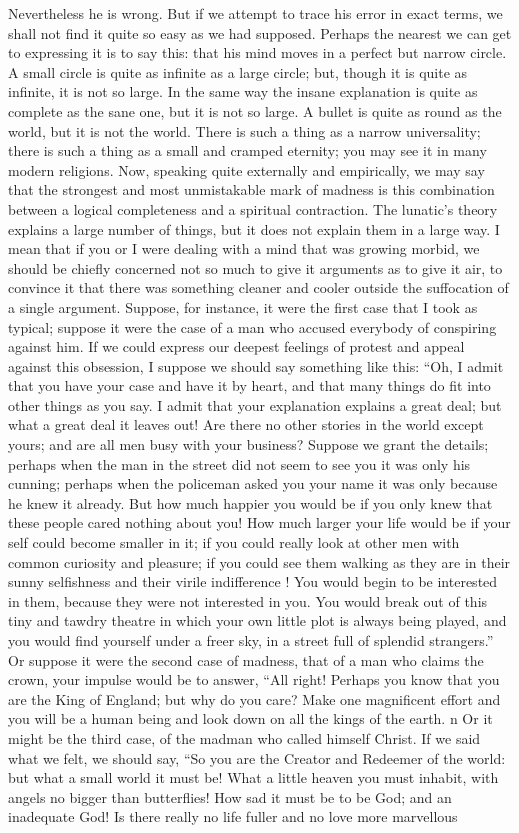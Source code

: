\documentclass{book}
\begin{document}
Nevertheless he is wrong. But if we attempt to trace his error in exact terms, we shall not find it quite so easy as we had supposed. Perhaps the nearest we can get to expressing it is to say this: that his mind moves in a perfect but narrow circle. A small circle is quite as infinite as a large circle; but, though it is quite as infinite, it is not so large. In the same way the insane explanation is quite as complete as the sane one, but it is not so large. A bullet is quite as round as the world, but it is not the world. There is such a thing as a narrow universality; there is such a thing as a small and cramped eternity; you may see it in many modern religions. Now, speaking quite externally and empirically, we may say that the strongest and most unmistakable mark of madness is this combination between a logical completeness and a spiritual contraction. The lunatic’s theory explains a large number of things, but it does not explain them in a large way. I mean that if you or I were dealing with a mind that was growing morbid, we should be chiefly concerned not so much to give it arguments as to give it air, to convince it that there was something cleaner and cooler outside the suffocation of a single argument. Suppose, for instance, it were the first case that I took as typical; suppose it were the case of a man who accused everybody of conspiring against him. If we could express our deepest feelings of protest and appeal against this obsession, I suppose we should say something like this: “Oh, I admit that you have your case and have it by heart, and that many things do fit into other things as you say. I admit that your explanation explains a great deal; but what a great deal it leaves out! Are there no other stories in the world except yours; and are all men busy with your business? Suppose we grant the details; perhaps when the man in the street did not seem to see you it was only his cunning; perhaps when the policeman asked you your name it was only because he knew it already. But how much happier you would be if you only knew that these people cared nothing about you! How much larger your life would be if your self could become smaller in it; if you could really look at other men with common curiosity and pleasure; if you could see them walking as they are in their sunny selfishness and their virile indifference ! You would begin to be interested in them, because they were not interested in you. You would break out of this tiny and tawdry theatre in which your own little plot is always being played, and you would find yourself under a freer sky, in a street full of splendid strangers.” Or suppose it were the second case of madness, that of a man who claims the crown, your impulse would be to answer, “All right! Perhaps you know that you are the King of England; but why do you care? Make one magnificent effort and you will be a human being and look down on all the kings of the earth. n Or it might be the third case, of the madman who called himself Christ. If we said what we felt, we should say, “So you are the Creator and Redeemer of the world: but what a small world it must be! What a little heaven you must inhabit, with angels no bigger than butterflies! How sad it must be to be God; and an inadequate God! Is there really no life fuller and no love more marvellous 
\end{document}
